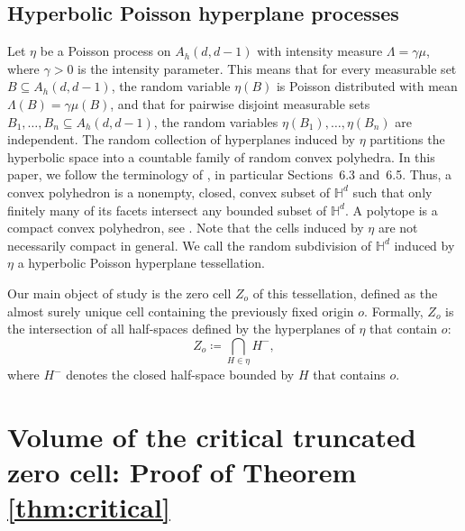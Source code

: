 \documentclass[11pt,a4paper]{article}
\theoremstyle{plain}
\theoremstyle{definition}
\theoremstyle{remark}
\def\HH{\mathbb{H}}
\begin{document}
\subsection{Hyperbolic Poisson hyperplane processes}

Let $\eta$ be a Poisson process on $A_h(d,d-1)$ with intensity measure $\Lambda=\gamma\mu$, where $\gamma>0$ is the intensity parameter. This means that for every measurable set $B\subseteq A_h(d,d-1)$, the random variable $\eta(B)$ is Poisson distributed with mean $\Lambda(B)=\gamma\mu(B)$, and that for pairwise disjoint measurable sets $B_1,\dots,B_n\subseteq A_h(d,d-1)$, the random variables $\eta(B_1),\dots,\eta(B_n)$ are independent.
The random collection of hyperplanes induced by $\eta$ partitions the hyperbolic space into a countable family of random convex polyhedra.
In this paper, we follow the terminology of \cite{Ratcliffe}, in particular Sections~6.3 and~6.5. Thus, a convex polyhedron is a nonempty, closed, convex subset of $\HH^d$ such that only finitely many of its facets intersect any bounded subset of $\HH^d$.
A polytope is a compact convex polyhedron, see \cite[Theorem~6.5.1]{Ratcliffe}.
Note that the cells induced by $\eta$ are not necessarily compact in general.
We call the random subdivision of $\HH^d$ induced by $\eta$ a hyperbolic Poisson hyperplane tessellation.

Our main object of study is the zero cell $Z_o$ of this tessellation, defined as the almost surely unique cell containing the previously fixed origin $o$. Formally, $Z_o$ is the intersection of all half-spaces defined by the hyperplanes of $\eta$ that contain $o$:
\[
Z_o \coloneqq \bigcap_{H \in \eta} H^{-},
\]
where $H^{-}$ denotes the closed half-space bounded by $H$ that contains $o$.





\section{Volume of the critical truncated zero cell: Proof of Theorem \ref{thm:critical}}\label{sec:CriticalProof}
\end{document}
